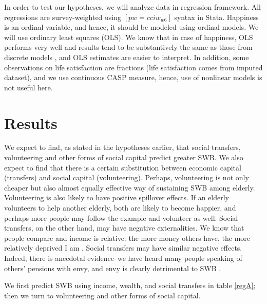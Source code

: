 \documentclass[10pt, letterpaper]{article}
\begin{document}
\begin{spacing}{1.4}
In order to test our hypotheses, we will analyze data in regression framework. 
 All regressions are survey-weighted using $[pw=cciw_{w6}]$ syntax in Stata.
Happiness is an ordinal variable, and hence, it should be modeled using ordinal
models. We will use ordinary least squares (OLS). We know that
in case of happiness, OLS performs very well and results tend to be substantively
the same as those from discrete models \citep{carbonell04,blanchflower11}, and
OLS estimates are easier to interpret.  In addition, some observations on life
satisfaction are fractions (life satisfaction comes from imputed dataset), and
we use continuous CASP measure, hence, use of nonlinear models is not useful
here. 


\section{Results}


 We expect to
find, as stated in the hypotheses earlier, that social transfers, volunteering
and other forms of social capital predict greater SWB. We also expect to
find that there is a  certain substitution  between economic capital (transfers) and social
capital (volunteering). Perhaps, volunteering is not only cheaper but also almost equally
effective way of sustaining SWB among elderly. Volunteering is also likely to have
positive spillover effects. If an elderly volunteers to help another elderly,
both are  likely to become happier, and perhaps more people may follow the
example and volunteer as well. Social transfers, on the other hand, may have
negative externalities. We know that people compare and income is relative: the
more money others have, the more relatively deprived I am
\citep{michalos85,luttmer05,bender12}. Social transfers may have similar negative
effects. Indeed, there is anecdotal evidence--we have heard many people speaking
of others' pensions with envy, and envy is clearly detrimental to SWB \citep{mujcic17}.

We first predict SWB using income, wealth, and social transfers in table \ref{regA}; then we turn
to volunteering and other forms of social capital.


\end{spacing}
\end{document}

